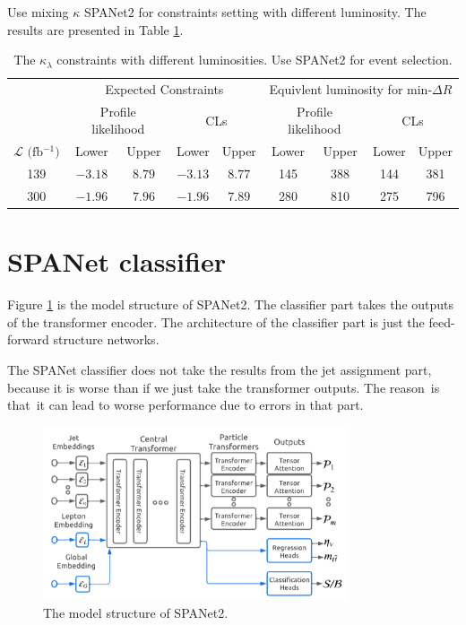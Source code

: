 \documentclass[12pt]{article}
\begin{document}
	Use mixing $\kappa$ SPANet2 for constraints setting with different luminosity. The results are presented in Table \ref{tab:kappa_constraint_luminosity_mix_class_SPANET2}.
	\begin{table}[htpb]
		\centering
		\caption{The $\kappa_\lambda$ constraints with different luminosities. Use SPANet2 for event selection.}
		\label{tab:kappa_constraint_luminosity_mix_class_SPANET2}
		\begin{tabular}{c|cc|cc|cc|cc}
										& \multicolumn{4}{c}{Expected Constraints}                         & \multicolumn{4}{c}{Equivlent luminosity for $\text{min-}\Delta R$}       \\
										& \multicolumn{2}{c}{Profile likelihood} & \multicolumn{2}{c}{CLs} & \multicolumn{2}{c}{Profile likelihood} & \multicolumn{2}{c}{CLs}         \\ \hline
		$\mathcal{L} \text{ (fb$^{-1}$)}$ & Lower               & Upper            & Lower       & Upper     & Lower              & Upper             & Lower          & Upper          \\ \hline
		139  & $-3.18$ & $8.79$ & $-3.13$ & $8.77$ & 145 & 388 & 144 & 381 \\
		300  & $-1.96$ & $7.96$ & $-1.96$ & $7.89$ & 280 & 810 & 275 & 796 \\
		\end{tabular}
	\end{table}
\section{SPANet classifier}%
\label{sec:spanet_classifier}
	Figure \ref{fig:SPANet2_structure} is the model structure of SPANet2. The classifier part takes the outputs of the transformer encoder. The architecture of the classifier part is just the feed-forward structure networks.
	
	The SPANet classifier does not take the results from the jet assignment part, because it is worse than if we just take the transformer outputs. The reason is that it can lead to worse performance due to errors in that part.
	\begin{figure}[htpb]
		\centering
		\includegraphics[width=0.8\textwidth]{SPANet2_structure.png}
		\caption{The model structure of SPANet2.}
		\label{fig:SPANet2_structure}
	\end{figure}
\end{document}

